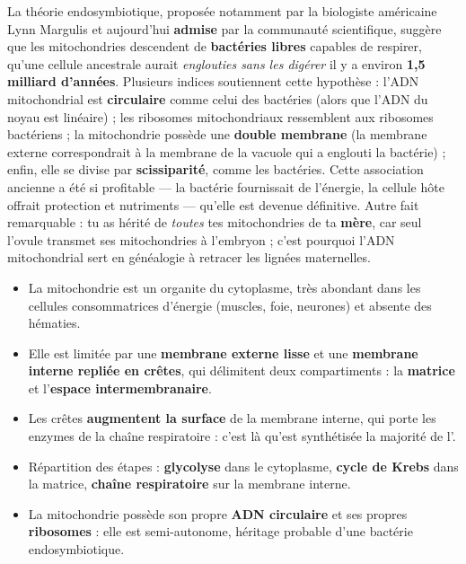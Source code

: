 \documentclass[11pt]{article}
\newcommand{\cle}[1]{{\popxbold\color{popdark}#1}}
\begin{document}
\begin{savaistu}
La \cle{théorie endosymbiotique}, proposée notamment par la biologiste américaine Lynn Margulis et aujourd'hui \textbf{admise} par la communauté scientifique, suggère que les mitochondries descendent de \textbf{bactéries libres} capables de respirer, qu'une cellule ancestrale aurait \emph{englouties sans les digérer} il y a environ \textbf{1,5 milliard d'années}. Plusieurs indices soutiennent cette hypothèse : l'ADN mitochondrial est \textbf{circulaire} comme celui des bactéries (alors que l'ADN du noyau est linéaire) ; les ribosomes mitochondriaux ressemblent aux ribosomes bactériens ; la mitochondrie possède une \textbf{double membrane} (la membrane externe correspondrait à la membrane de la vacuole qui a englouti la bactérie) ; enfin, elle se divise par \textbf{scissiparité}, comme les bactéries. Cette association ancienne a été si profitable — la bactérie fournissait de l'énergie, la cellule hôte offrait protection et nutriments — qu'elle est devenue définitive. Autre fait remarquable : tu as hérité de \emph{toutes} tes mitochondries de ta \textbf{mère}, car seul l'ovule transmet ses mitochondries à l'embryon ; c'est pourquoi l'ADN mitochondrial sert en généalogie à retracer les lignées maternelles.
\end{savaistu}

\begin{aretenir}
\begin{itemize}
\item La \cle{mitochondrie} est un organite du cytoplasme, très abondant dans les cellules consommatrices d'énergie (muscles, foie, neurones) et absente des hématies.
\item Elle est limitée par une \textbf{membrane externe lisse} et une \textbf{membrane interne repliée en crêtes}, qui délimitent deux compartiments : la \textbf{matrice} et l'\textbf{espace intermembranaire}.
\item Les crêtes \textbf{augmentent la surface} de la membrane interne, qui porte les enzymes de la chaîne respiratoire : c'est là qu'est synthétisée la majorité de l'.
\item Répartition des étapes : \textbf{glycolyse} dans le cytoplasme, \textbf{cycle de Krebs} dans la matrice, \textbf{chaîne respiratoire} sur la membrane interne.
\item La mitochondrie possède son propre \textbf{ADN circulaire} et ses propres \textbf{ribosomes} : elle est semi-autonome, héritage probable d'une bactérie endosymbiotique.
\end{itemize}
\end{aretenir}
\end{document}
